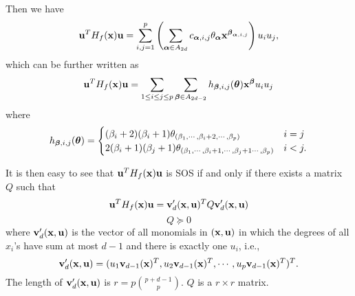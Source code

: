 \documentclass[11pt]{article}
\begin{document}
Then we have
\begin{equation}\notag
{\bf u}^TH_f({\bf x}){\bf u} = \sum_{i,j=1}^p \left( \sum_{{\boldsymbol\alpha} \in A_{2d}} c_{{\boldsymbol\alpha}, i, j} \theta_{\boldsymbol\alpha}  {\bf x}^{{\boldsymbol\beta}_{{\boldsymbol\alpha}, i,j}} \right) u_iu_j,
\end{equation}
which can be further written as
\begin{equation} \label{lhs}
{\bf u}^TH_f({\bf x}){\bf u} = \sum_{1 \le i \le j \le p}  \sum_{{\boldsymbol\beta} \in A_{2d - 2}} h_{{\boldsymbol\beta}, i, j}({\boldsymbol\theta}) {\bf x}^{{\boldsymbol\beta}}  u_iu_j
\end{equation}
where
\begin{equation}\notag
h_{{\boldsymbol\beta}, i, j}({\boldsymbol\theta}) =
\begin{cases}
(\beta_i + 2) (\beta_i + 1) \theta_{(\beta_1, \cdots, \beta_i + 2, \cdots, \beta_p)} & i = j\\
2(\beta_i + 1) (\beta_j + 1) \theta_{(\beta_1, \cdots, \beta_i + 1, \cdots, \beta_j + 1 \cdots, \beta_p)} & i < j.
\end{cases}
\end{equation}

It is then easy to see that ${\bf u}^T H_f({\bf x}) {\bf u}$ is SOS if and only if there exists a matrix $Q$ such that
\begin{equation} \label{sos-cvx}
{\bf u}^TH_f({\bf x}){\bf u} = {\bf v}_d'({\bf x}, {\bf u})^T Q {\bf v}_d'({\bf x}, {\bf u})
\end{equation}
\begin{equation} \label{sos-cvx-psd}
Q \succeq 0
\end{equation}
where ${\bf v}_d'({\bf x}, {\bf u})$ is the vector of all monomials in $({\bf x}, {\bf u})$ in which the degrees of all $x_i$'s have sum at most $d-1$ and there is exactly one $u_i$, i.e., 
$${\bf v}_d'({\bf x}, {\bf u}) = (u_1 {\bf v}_{d-1}({\bf x})^T, u_2 {\bf v}_{d-1}({\bf x})^T, \cdots, u_p {\bf v}_{d-1}({\bf x})^T )^T.$$
The length of ${\bf v}_d'({\bf x}, {\bf u})$ is $r = p{p+d-1 \choose p}$. $Q$ is a $r \times r$ matrix.
\end{document}
